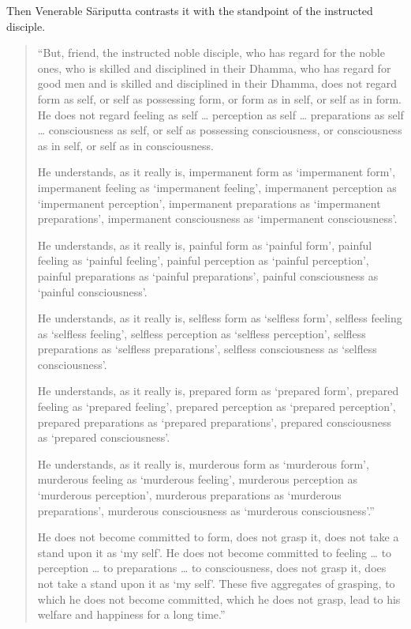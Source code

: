 Then Venerable Sāriputta contrasts it with the standpoint of the instructed disciple.

\begin{quote}
``But, friend, the instructed noble disciple, who has regard for the noble ones, who is skilled and disciplined in their Dhamma, who has regard for good men and is skilled and disciplined in their Dhamma, does not regard form as self, or self as possessing form, or form as in self, or self as in form. He does not regard feeling as self \ldots{} perception as self \ldots{} preparations as self \ldots{} consciousness as self, or self as possessing consciousness, or consciousness as in self, or self as in consciousness.

He understands, as it really is, impermanent form as `impermanent form', impermanent feeling as `impermanent feeling', impermanent perception as `impermanent perception', impermanent preparations as `impermanent preparations', impermanent consciousness as `impermanent consciousness'.

He understands, as it really is, painful form as `painful form', painful feeling as `painful feeling', painful perception as `painful perception', painful preparations as `painful preparations', painful consciousness as `painful consciousness'.

He understands, as it really is, selfless form as `selfless form', selfless feeling as `selfless feeling', selfless perception as `selfless perception', selfless preparations as `selfless preparations', selfless consciousness as `selfless consciousness'.

He understands, as it really is, prepared form as `prepared form', prepared feeling as `prepared feeling', prepared perception as `prepared perception', prepared preparations as `prepared preparations', prepared consciousness as `prepared consciousness'.

He understands, as it really is, murderous form as `murderous form', murderous feeling as `murderous feeling', murderous perception as `murderous perception', murderous preparations as `murderous preparations', murderous consciousness as `murderous consciousness'.''

He does not become committed to form, does not grasp it, does not take a stand upon it as `my self'. He does not become committed to feeling \ldots{} to perception \ldots{} to preparations \ldots{} to consciousness, does not grasp it, does not take a stand upon it as `my self'. These five aggregates of grasping, to which he does not become committed, which he does not grasp, lead to his welfare and happiness for a long time.''
\end{quote}

